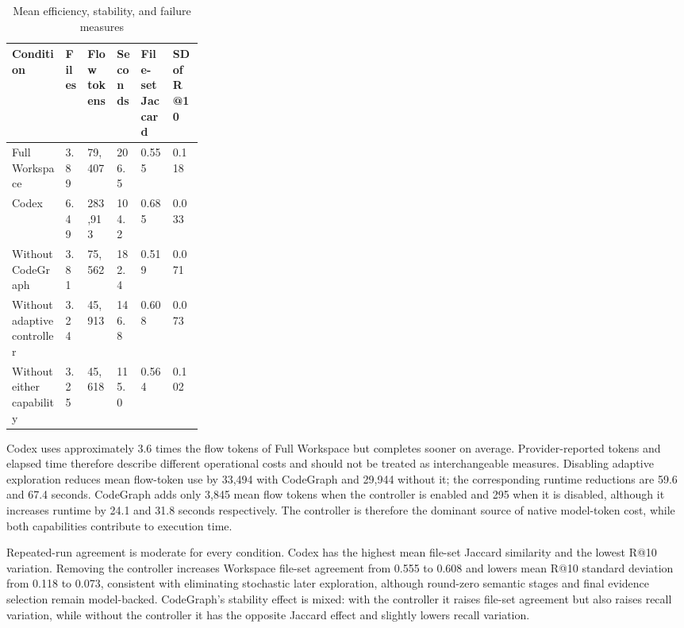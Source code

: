 \begin{table}[htbp]
\centering
\caption{Mean efficiency, stability, and failure measures}\label{tab:efficiency-stability-and-failures-6}

\begingroup
\small
\setlength{\tabcolsep}{3pt}
\renewcommand{\arraystretch}{1.10}
\begin{tabularx}{\linewidth}{@{}L{0.28\linewidth}*{5}{Z}@{}}
\toprule
\textbf{Condition} & \textbf{Files} & \textbf{Flow tokens} & \textbf{Seconds} & \textbf{File-set Jaccard} & \textbf{SD of R@10} \\
\midrule
Full Workspace & 3.89 & 79,407 & 206.5 & 0.555 & 0.118 \\
Codex & 6.49 & 283,913 & 104.2 & 0.685 & 0.033 \\
Without CodeGraph & 3.81 & 75,562 & 182.4 & 0.519 & 0.071 \\
Without adaptive controller & 3.24 & 45,913 & 146.8 & 0.608 & 0.073 \\
Without either capability & 3.25 & 45,618 & 115.0 & 0.564 & 0.102 \\
\bottomrule
\end{tabularx}
\endgroup
\end{table}
\FloatBarrier

Codex uses approximately 3.6 times the flow tokens of Full Workspace but completes sooner on average. Provider-reported tokens and elapsed time therefore describe different operational costs and should not be treated as interchangeable measures. Disabling adaptive exploration reduces mean flow-token use by 33,494 with CodeGraph and 29,944 without it; the corresponding runtime reductions are 59.6 and 67.4 seconds. CodeGraph adds only 3,845 mean flow tokens when the controller is enabled and 295 when it is disabled, although it increases runtime by 24.1 and 31.8 seconds respectively. The controller is therefore the dominant source of native model-token cost, while both capabilities contribute to execution time.

Repeated-run agreement is moderate for every condition. Codex has the highest mean file-set Jaccard similarity and the lowest R@10 variation. Removing the controller increases Workspace file-set agreement from 0.555 to 0.608 and lowers mean R@10 standard deviation from 0.118 to 0.073, consistent with eliminating stochastic later exploration, although round-zero semantic stages and final evidence selection remain model-backed. CodeGraph's stability effect is mixed: with the controller it raises file-set agreement but also raises recall variation, while without the controller it has the opposite Jaccard effect and slightly lowers recall variation.

